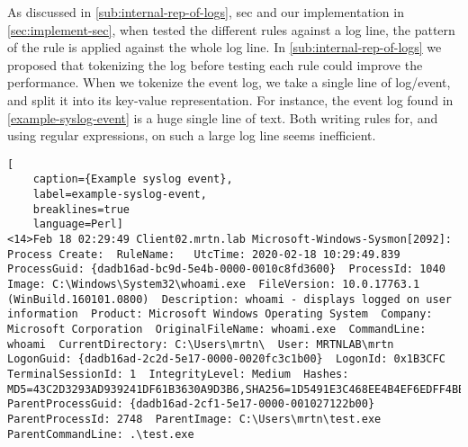 As discussed in \cref{sub:internal-rep-of-logs}, \acrshort{sec} and our implementation in \cref{sec:implement-sec}, when tested the different rules against a log line, the pattern of the rule is applied against the whole log line. In \cref{sub:internal-rep-of-logs} we proposed that tokenizing the log before testing each rule could improve the performance. When we tokenize the event log, we take a single line of log/event, and split it into its key-value representation. For instance, the event log found in \cref{example-syslog-event} is a huge single line of text. Both writing rules for, and using regular expressions, on such a large log line seems inefficient.
\begin{lstlisting}[
    caption={Example syslog event},
    label=example-syslog-event,
    breaklines=true
    language=Perl]
<14>Feb 18 02:29:49 Client02.mrtn.lab Microsoft-Windows-Sysmon[2092]: Process Create:  RuleName:   UtcTime: 2020-02-18 10:29:49.839  ProcessGuid: {dadb16ad-bc9d-5e4b-0000-0010c8fd3600}  ProcessId: 1040  Image: C:\Windows\System32\whoami.exe  FileVersion: 10.0.17763.1 (WinBuild.160101.0800)  Description: whoami - displays logged on user information  Product: Microsoft Windows Operating System  Company: Microsoft Corporation  OriginalFileName: whoami.exe  CommandLine: whoami  CurrentDirectory: C:\Users\mrtn\  User: MRTNLAB\mrtn  LogonGuid: {dadb16ad-2c2d-5e17-0000-0020fc3c1b00}  LogonId: 0x1B3CFC  TerminalSessionId: 1  IntegrityLevel: Medium  Hashes: MD5=43C2D3293AD939241DF61B3630A9D3B6,SHA256=1D5491E3C468EE4B4EF6EDFF4BBC7D06EE83180F6F0B1576763EA2EFE049493A,IMPHASH=7FF0758B766F747CE57DFAC70743FB88  ParentProcessGuid: {dadb16ad-2cf1-5e17-0000-001027122b00}  ParentProcessId: 2748  ParentImage: C:\Users\mrtn\test.exe  ParentCommandLine: .\test.exe
\end{lstlisting}

